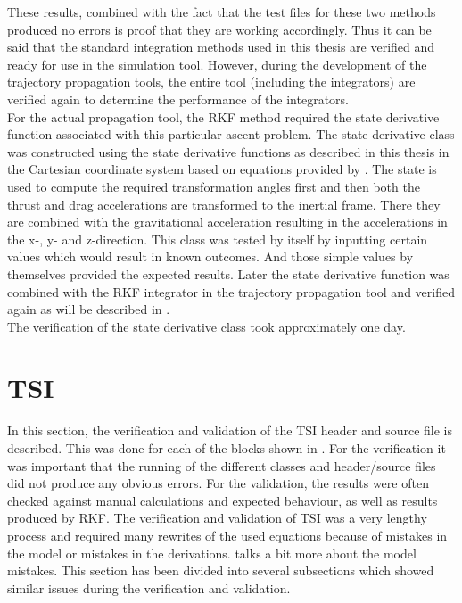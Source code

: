 \noindent
These results, combined with the fact that the test files for these two methods produced no errors is proof that they are working accordingly. Thus it can be said that the standard integration methods used in this thesis are verified and ready for use in the simulation tool. However, during the development of the trajectory propagation tools, the entire tool (including the integrators) are verified again to determine the performance of the integrators.\\
For the actual propagation tool, the \ac{RKF} method required the state derivative function associated with this particular ascent problem. The state derivative class was constructed using the state derivative functions as described in this thesis in the Cartesian coordinate system based on equations provided by \cite{mooij1994motion}. The state is used to compute the required transformation angles first and then both the thrust and drag accelerations are transformed to the inertial frame. There they are combined with the gravitational acceleration resulting in the accelerations in the x-, y- and z-direction. This class was tested by itself by inputting certain values which would result in known outcomes. And those simple values by themselves provided the expected results. Later the state derivative function was combined with the \ac{RKF} integrator in the trajectory propagation tool and verified again as will be described in . \\
The verification of the state derivative class took approximately one day. 



\section{\acl{TSI}}
\label{sec:tsiverval}
In this section, the verification and validation of the \ac{TSI} header and source file is described. This was done for each of the blocks shown in . For the verification it was important that the running of the different classes and header/source files did not produce any obvious errors. For the validation, the results were often checked against manual calculations and expected behaviour, as well as results produced by \ac{RKF}. The verification and validation of \ac{TSI} was a very lengthy process and required many rewrites of the used equations because of mistakes in the model or mistakes in the derivations.  talks a bit more about the model mistakes. This section has been divided into several subsections which showed similar issues during the verification and validation.

